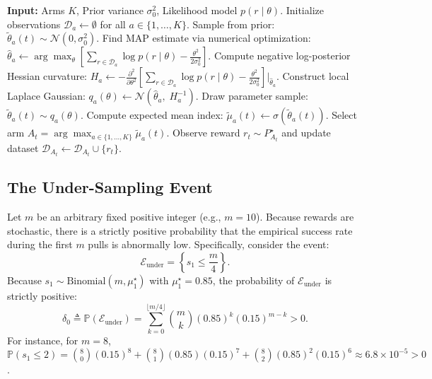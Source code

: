 \documentclass[twoside]{article}
\begin{document}
\begin{algorithm}[h]
\caption{Parametric Approximate Inference Thompson Sampling (Laplace-TS)}
\label{alg:laplace_ts}
\begin{algorithmic}[1]
\State \textbf{Input:} Arms $K$, Prior variance $\sigma_0^2$, Likelihood model $p(r \mid \theta)$.
\State Initialize observations $\mathcal{D}_a \leftarrow \emptyset$ for all $a \in \{1, \dots, K\}$.
            \State Sample from prior: $\tilde{\theta}_a(t) \sim \mathcal{N}(0, \sigma_0^2)$.
        \Else
            \State Find MAP estimate via numerical optimization:
            \State $\hat{\theta}_a \leftarrow \arg\max_\theta \left[ \sum_{r \in \mathcal{D}_a} \log p(r \mid \theta) - \frac{\theta^2}{2\sigma_0^2} \right]$.
            \State Compute negative log-posterior Hessian curvature:
            \State $H_a \leftarrow - \frac{\partial^2}{\partial \theta^2} \left[ \sum_{r \in \mathcal{D}_a} \log p(r \mid \theta) - \frac{\theta^2}{2\sigma_0^2} \right]\Big|_{\hat{\theta}_a}$.
            \State Construct local Laplace Gaussian: $q_a(\theta) \leftarrow \mathcal{N}\left(\hat{\theta}_a, \; H_a^{-1}\right)$.
            \State Draw parameter sample: $\tilde{\theta}_a(t) \sim q_a(\theta)$.
        \EndIf
        \State Compute expected mean index: $\tilde{\mu}_a(t) \leftarrow \sigma(\tilde{\theta}_a(t))$.
    \EndFor
    \State Select arm $A_t = \arg\max_{a \in \{1, \dots, K\}} \tilde{\mu}_a(t)$.
    \State Observe reward $r_t \sim P^\star_{A_t}$ and update dataset $\mathcal{D}_{A_t} \leftarrow \mathcal{D}_{A_t} \cup \{r_t\}$.
\EndFor
\end{algorithmic}
\end{algorithm}

\subsection{The Under-Sampling Event}
Let $m$ be an arbitrary fixed positive integer (e.g., $m = 10$). Because rewards are stochastic, there is a strictly positive probability that the empirical success rate during the first $m$ pulls is abnormally low. Specifically, consider the event:
\begin{equation}
\mathcal{E}_{\text{under}} = \left\{ s_1 \le \frac{m}{4} \right\}.
\end{equation}
Because $s_1 \sim \text{Binomial}(m, \mu_1^\star)$ with $\mu_1^\star = 0.85$, the probability of $\mathcal{E}_{\text{under}}$ is strictly positive:
\begin{equation}
\delta_0 \triangleq \mathbb{P}(\mathcal{E}_{\text{under}}) = \sum_{k=0}^{\lfloor m/4 \rfloor} \binom{m}{k} (0.85)^k (0.15)^{m-k} > 0.
\end{equation}
For instance, for $m = 8$, $\mathbb{P}(s_1 \le 2) = \binom{8}{0}(0.15)^8 + \binom{8}{1}(0.85)(0.15)^7 + \binom{8}{2}(0.85)^2(0.15)^6 \approx 6.8 \times 10^{-5} > 0$.
\end{document}
